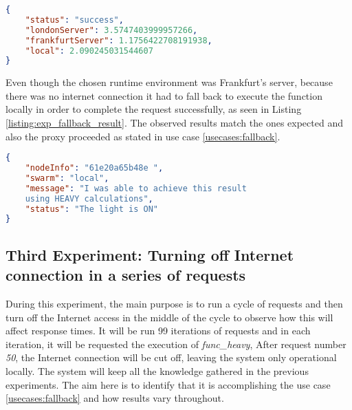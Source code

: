 \begin{listing}
\begin{lstlisting}[language=json, basicstyle=\footnotesize]
{
    "status": "success",
    "londonServer": 3.5747403999957266,
    "frankfurtServer": 1.1756422708191938,
    "local": 2.090245031544607
}

\end{lstlisting}
\caption{}
\label{listing:exp_weight_query}
\end{listing}

Even though the chosen runtime environment was Frankfurt's server, because there
was no internet connection it had to fall back to execute the function locally in
order to complete the request successfully, as seen in Listing
\ref{listing:exp_fallback_result}. The observed results match the ones expected
and also the proxy proceeded as stated in use case \ref{usecases:fallback}.

\begin{listing}
\begin{lstlisting}[language=json, basicstyle=\footnotesize]
{
    "nodeInfo": "61e20a65b48e ",
    "swarm": "local",
    "message": "I was able to achieve this result 
    using HEAVY calculations",
    "status": "The light is ON"
}
\end{lstlisting}
\caption{The request was executed locally, as indicated by the key \textit{swarm},
which is the swarm (runtime environment) where the function was executed.
\textit{local}, is the name given to the local network of devices, as configured
when setting up the proxy.}
\label{listing:exp_fallback_result}
\end{listing}


\subsection{Third Experiment: Turning off Internet connection in a series of requests}
During this experiment, the main purpose is to run a cycle of requests and then
turn off the Internet access in the middle of the cycle to observe how this will
affect response times. It will be run 99 iterations of requests and in each
iteration, it will be requested the execution of \textit{func\_heavy}, After
request number \textit{50}, the Internet connection will be cut off, leaving the
system only operational locally. The system will keep all the knowledge gathered
in the previous experiments. The aim here is to identify that it is accomplishing
the use case \ref{usecases:fallback} and how results vary throughout.

